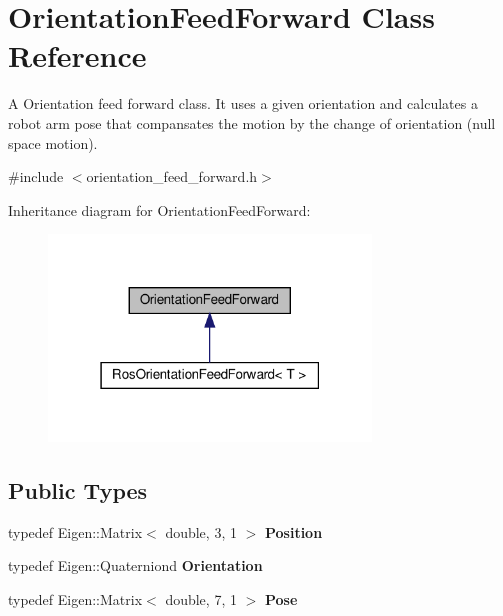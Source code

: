 \hypertarget{classOrientationFeedForward}{}\section{Orientation\+Feed\+Forward Class Reference}
\label{classOrientationFeedForward}


A Orientation feed forward class. It uses a given orientation and calculates a robot arm pose that compansates the motion by the change of orientation (null space motion).  




{\ttfamily \#include $<$orientation\+\_\+feed\+\_\+forward.\+h$>$}



Inheritance diagram for Orientation\+Feed\+Forward\+:\nopagebreak
\begin{figure}[H]
\begin{center}
\leavevmode
\includegraphics[width=243pt]{dd/d46/classOrientationFeedForward__inherit__graph}
\end{center}
\end{figure}
\subsection*{Public Types}
\begin{DoxyCompactItemize}
\item 
\mbox{\label{classOrientationFeedForward_a45f6220dd29a9df06f62eeed86189101}} 
typedef Eigen\+::\+Matrix$<$ double, 3, 1 $>$ {\bfseries Position}
\item 
\mbox{\label{classOrientationFeedForward_a329654d4c6d79679903a76c624330f99}} 
typedef Eigen\+::\+Quaterniond {\bfseries Orientation}
\item 
\mbox{\label{classOrientationFeedForward_a68247ebc7099747e21cbd56d4dbc405a}} 
typedef Eigen\+::\+Matrix$<$ double, 7, 1 $>$ {\bfseries Pose}
\end{DoxyCompactItemize}

